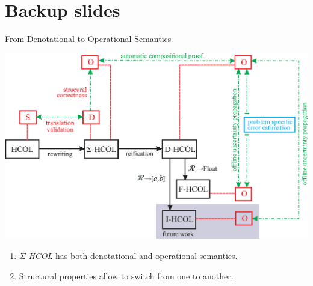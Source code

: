 \documentclass[aspectratio=169]{beamer}
\newcommand{\SHCOL}{\texorpdfstring{$\Sigma$-\emph{HCOL}}{Sigma-HCOL}}
\begin{document}
\section{Backup slides}

\begin{frame}{From Denotational to Operational Semantics}
  \begin{center}
    \includegraphics[width=0.8\columnwidth]{figures/semantics.eps}
  \end{center}
  
  \begin{enumerate}
  \item {\SHCOL} has both denotational and operational semantics.
  \item Structural properties allow to switch from one to another.
  \end{enumerate}
  
\end{frame}
\end{document}
